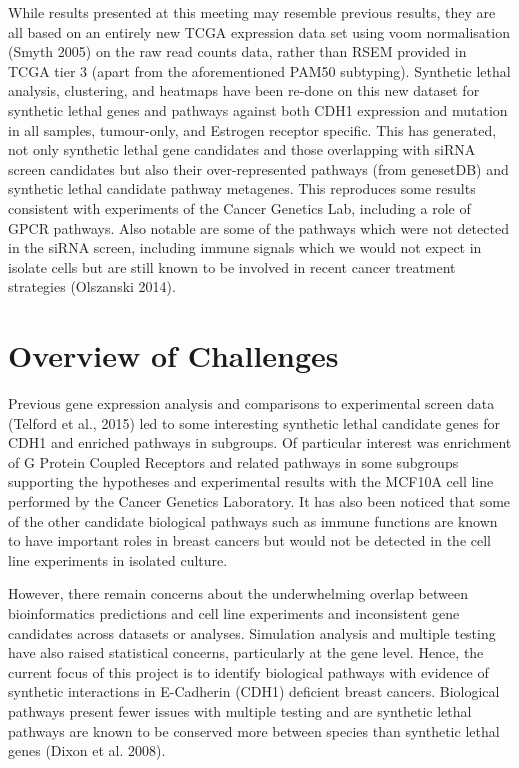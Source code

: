 While results presented at this meeting may resemble previous results, they are all based on an entirely new TCGA expression data set using voom normalisation (Smyth 2005) on the raw read counts data, rather than RSEM provided in TCGA tier 3 (apart from the aforementioned PAM50 subtyping).  Synthetic lethal analysis, clustering, and heatmaps have been re-done on this new dataset for synthetic lethal genes and pathways against both CDH1 expression and mutation in all samples, tumour-only, and Estrogen receptor specific. This has generated, not only synthetic lethal gene candidates and those overlapping with siRNA screen candidates but also their over-represented pathways (from genesetDB) and synthetic lethal candidate pathway metagenes. This reproduces some results consistent with experiments of the Cancer Genetics Lab, including a role of GPCR pathways. Also notable are some of the pathways which were not detected in the siRNA screen, including immune signals which we would not expect in isolate cells but are still known to be involved in recent cancer treatment strategies (Olszanski 2014). 

\section{Overview of Challenges}

Previous gene expression analysis and comparisons to experimental screen data (Telford et al., 2015) led to some interesting synthetic lethal candidate genes for CDH1 and enriched pathways in subgroups. Of particular interest was enrichment of G Protein Coupled Receptors and related pathways in some subgroups supporting the hypotheses and experimental results with the MCF10A cell line performed by the Cancer Genetics Laboratory. It has also been noticed that some of the other candidate biological pathways such as immune functions are known to have important roles in breast cancers but would not be detected in the cell line experiments in isolated culture.

However, there remain concerns about the underwhelming overlap between bioinformatics predictions and cell line experiments and inconsistent gene candidates across datasets or analyses. Simulation analysis and multiple testing have also raised statistical concerns, particularly at the gene level. Hence, the current focus of this project is to identify biological pathways with evidence of synthetic interactions in E-Cadherin (CDH1) deficient breast cancers. Biological pathways present fewer issues with multiple testing and are synthetic lethal pathways are known to be conserved more between species than synthetic lethal genes (Dixon et al. 2008). 

